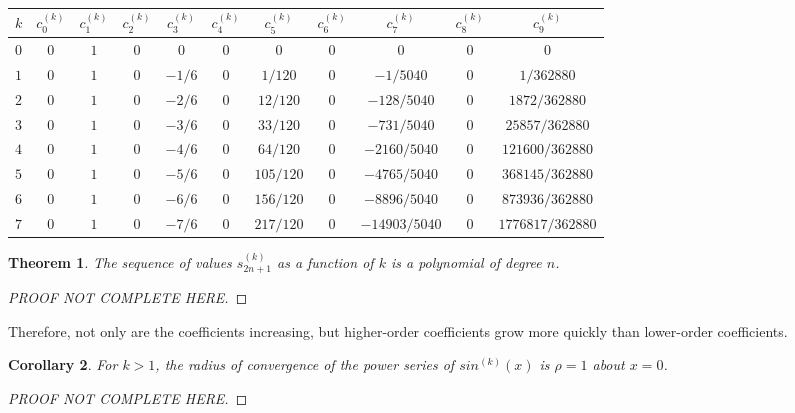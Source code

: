 \documentclass{article}
\newtheorem{theorem}{Theorem}
\newtheorem{corollary}[theorem]{Corollary}
\begin{document}
    \begin{table}[h]
    \centering
    \begin{tabular}{@{}l|cccccccccc@{}}
    $k$ & $c_{0}^{(k)}$ & $c_{1}^{(k)}$ & $c_{2}^{(k)}$ & $c_{3}^{(k)}$ & $c_{4}^{(k)}$ & $c_{5}^{(k)}$ & $c_{6}^{(k)}$ & $c_{7}^{(k)}$ & $c_{8}^{(k)}$ & $c_{9}^{(k)}$ \\ \midrule
    $0$ & $0$ & $1$ & $0$ & $0$    & $0$ & $0$       & $0$ & $0$           & $0$ & $0$              \\
    $1$ & $0$ & $1$ & $0$ & $-1/6$ & $0$ & $1/120$   & $0$ & $-1/5040$     & $0$ & $1/362880$       \\
    $2$ & $0$ & $1$ & $0$ & $-2/6$ & $0$ & $12/120$  & $0$ & $-128/5040$   & $0$ & $1872/362880$    \\
    $3$ & $0$ & $1$ & $0$ & $-3/6$ & $0$ & $33/120$  & $0$ & $-731/5040$   & $0$ & $25857/362880$   \\
    $4$ & $0$ & $1$ & $0$ & $-4/6$ & $0$ & $64/120$  & $0$ & $-2160/5040$  & $0$ & $121600/362880$  \\
    $5$ & $0$ & $1$ & $0$ & $-5/6$ & $0$ & $105/120$ & $0$ & $-4765/5040$  & $0$ & $368145/362880$  \\
    $6$ & $0$ & $1$ & $0$ & $-6/6$ & $0$ & $156/120$ & $0$ & $-8896/5040$  & $0$ & $873936/362880$  \\
    $7$ & $0$ & $1$ & $0$ & $-7/6$ & $0$ & $217/120$ & $0$ & $-14903/5040$ & $0$ & $1776817/362880$ \\
    \end{tabular}
    \end{table}

    \begin{theorem}
        The sequence of values $s_{2n+1}^{(k)}$ as a function of $k$ is a polynomial of degree $n$.
    \end{theorem}
    \begin{proof}
        [PROOF NOT COMPLETE HERE]
    \end{proof}

    Therefore, not only are the coefficients increasing, but higher-order coefficients grow more quickly than lower-order coefficients.

    \begin{corollary}
        For $k > 1$, the radius of convergence of the power series of $sin^{(k)}(x)$ is $\rho = 1$ about $x = 0$.
    \end{corollary}
    \begin{proof}
        [PROOF NOT COMPLETE HERE]
    \end{proof}
\end{document}
